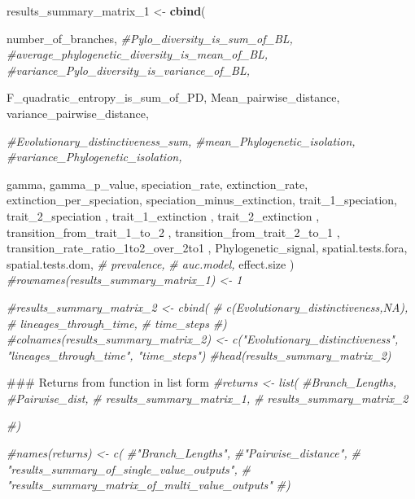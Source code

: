 \documentclass[]{book}
\newenvironment{Shaded}{\begin{snugshade}}{\end{snugshade}}
\newcommand{\KeywordTok}[1]{\textcolor[rgb]{0.13,0.29,0.53}{\textbf{{#1}}}}
\newcommand{\DecValTok}[1]{\textcolor[rgb]{0.00,0.00,0.81}{{#1}}}
\newcommand{\StringTok}[1]{\textcolor[rgb]{0.31,0.60,0.02}{{#1}}}
\newcommand{\CommentTok}[1]{\textcolor[rgb]{0.56,0.35,0.01}{\textit{{#1}}}}
\newcommand{\NormalTok}[1]{{#1}}
\theoremstyle{definition}
\theoremstyle{definition}
\theoremstyle{definition}
\theoremstyle{remark}
\begin{document}
\begin{Shaded}
\begin{Highlighting}[]
\NormalTok{results_summary_matrix_}\DecValTok{1}\NormalTok{ <-}\StringTok{ }\KeywordTok{cbind}\NormalTok{(}

\NormalTok{        number_of_branches,}
        \CommentTok{#Pylo_diversity_is_sum_of_BL,}
        \CommentTok{#average_phylogenetic_diversity_is_mean_of_BL,}
        \CommentTok{#variance_Pylo_diversity_is_variance_of_BL,}

\NormalTok{        F_quadratic_entropy_is_sum_of_PD,}
\NormalTok{        Mean_pairwise_distance,}
\NormalTok{        variance_pairwise_distance,}

        \CommentTok{#Evolutionary_distinctiveness_sum,}
        \CommentTok{#mean_Phylogenetic_isolation,}
        \CommentTok{#variance_Phylogenetic_isolation,}

\NormalTok{        gamma,}
\NormalTok{        gamma_p_value,}
\NormalTok{        speciation_rate,}
\NormalTok{        extinction_rate,}
\NormalTok{        extinction_per_speciation,}
\NormalTok{        speciation_minus_extinction,}
\NormalTok{        trait_1_speciation,}
\NormalTok{        trait_2_speciation ,}
\NormalTok{        trait_1_extinction ,}
\NormalTok{        trait_2_extinction ,}
\NormalTok{        transition_from_trait_1_to_}\DecValTok{2}\NormalTok{ ,}
\NormalTok{        transition_from_trait_2_to_}\DecValTok{1}\NormalTok{ ,}
\NormalTok{        transition_rate_ratio_1to2_over_2to1 ,}
\NormalTok{        Phylogenetic_signal,}
\NormalTok{        spatial.tests.fora,}
\NormalTok{        spatial.tests.dom,}
       \CommentTok{# prevalence,}
       \CommentTok{# auc.model,}
\NormalTok{        effect.size}
\NormalTok{      )}
      \CommentTok{#rownames(results_summary_matrix_1) <- 1}

      \CommentTok{#results_summary_matrix_2 <- cbind(}
      \CommentTok{#  c(Evolutionary_distinctiveness,NA),}
      \CommentTok{#  lineages_through_time,}
      \CommentTok{#  time_steps}
      \CommentTok{#)}
      \CommentTok{#colnames(results_summary_matrix_2) <- c("Evolutionary_distinctiveness", "lineages_through_time", "time_steps")}
      \CommentTok{#head(results_summary_matrix_2)}

\NormalTok{      ### Returns from function in list form}
      \CommentTok{#returns <- list(}
        \CommentTok{#Branch_Lengths,}
        \CommentTok{#Pairwise_dist,}
      \CommentTok{#  results_summary_matrix_1,}
      \CommentTok{#  results_summary_matrix_2}

      \CommentTok{#)}

      \CommentTok{#names(returns) <- c(}
        \CommentTok{#"Branch_Lengths",}
        \CommentTok{#"Pairwise_distance",}
       \CommentTok{# "results_summary_of_single_value_outputs",}
       \CommentTok{# "results_summary_matrix_of_multi_value_outputs"}
      \CommentTok{#)}
\end{Highlighting}
\end{Shaded}
\end{document}
